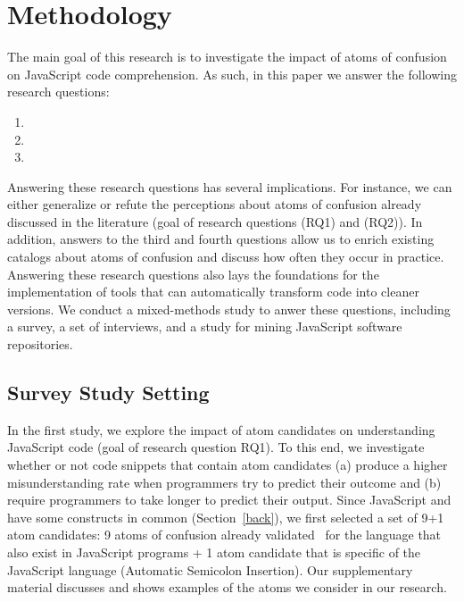 \section{Methodology}
\label{method}

The main goal of this research is to investigate the impact of atoms of confusion on JavaScript code comprehension. As such, in this paper we answer the following research questions: 

\begin{enumerate}[(RQ1)]
\item \rqa 
\item \rqb
\item \rqd
\end{enumerate}

 
Answering these research questions has several implications. For instance, we can either generalize or refute the perceptions about atoms of confusion already discussed in the literature (goal of research questions (RQ1) and (RQ2)). In addition, answers to the third and fourth questions allow us to enrich existing catalogs about atoms of confusion and discuss how often they occur in practice. Answering these research questions also lays the foundations for the implementation of tools that can automatically transform code into cleaner versions.
We conduct a mixed-methods study to anwer these questions, including a survey, a set of interviews, and a study for mining JavaScript software repositories.  


\subsection{Survey Study Setting}\label{sec:meth:survey}

In the first study, we explore the impact of atom candidates on
understanding JavaScript code (goal of research question RQ1).	
To this end, we investigate whether or not code snippets that
contain atom candidates (a) produce a higher
misunderstanding rate when programmers
try to predict their outcome and (b) require
programmers to take longer to predict their output.
Since JavaScript and \clang have some constructs in common (Section~\ref{back}), we first selected a set of 9+1 atom candidates: 9 atoms of confusion already validated~\cite{DBLP:conf/sigsoft/GopsteinIYDZYC17} for the \clang language that also exist in JavaScript programs + 1 atom candidate that is specific of the JavaScript language (Automatic Semicolon Insertion).
Our supplementary material discusses and shows examples of the atoms we consider in our research. 

